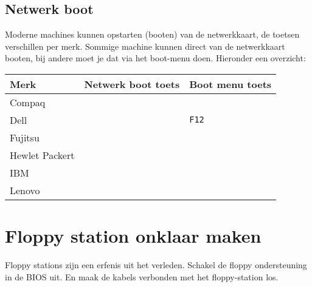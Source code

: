 \subsection{Netwerk boot}
Moderne machines kunnen opstarten (booten) van de netwerkkaart, de toetsen verschillen per merk. Sommige machine kunnen direct van de netwerkkaart booten, bij andere moet je dat via het boot-menu doen. Hieronder een overzicht:
\begin{table}[H]
	\begin{tabular}{| l | l |  l |}
	\hline 
	\textbf{Merk} & \textbf{Netwerk boot toets} & \textbf{Boot menu toets}\\
	\hline
	Compaq &  & \textt{F12}\\
	\hline
	Dell &  & \texttt{F12} \\
	\hline
	Fujitsu &  & \\
	\hline
	Hewlet Packert &   & \\
	\hline
	IBM &   & \\
	\hline
	Lenovo &  &  \\
	\hline
\end{tabular}
\end{table}

\section{Floppy station onklaar maken}
Floppy stations zijn een erfenis uit het verleden. Schakel de floppy ondersteuning in de BIOS uit. En maak de kabels verbonden met het floppy-station los.


